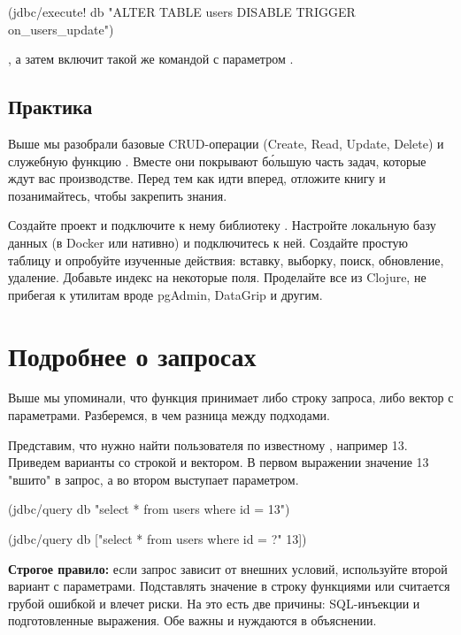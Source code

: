\begin{english}
  \begin{clojure}
(jdbc/execute! db
  "ALTER TABLE users DISABLE TRIGGER on_users_update")
  \end{clojure}
\end{english}

\noindent
, а затем включит такой же командой с параметром .

\subsection{Практика}

Выше мы разобрали базовые CRUD-операции (Create, Read, Update, Delete) и служебную функцию . Вместе они покрывают б\'{о}льшую часть задач, которые ждут вас производстве. Перед тем как идти вперед, отложите книгу и позанимайтесь, чтобы закрепить знания.

Создайте проект и подключите к нему библиотеку . Настройте локальную базу данных (в Docker или нативно) и подключитесь к ней. Создайте простую таблицу и опробуйте изученные действия: вставку, выборку, поиск, обновление, удаление. Добавьте индекс на некоторые поля. Проделайте все из Clojure, не прибегая к утилитам вроде pgAdmin, DataGrip и другим.

\section{Подробнее о запросах}

Выше мы упоминали, что функция  принимает либо строку запроса, либо вектор с параметрами. Разберемся, в чем разница между подходами.

Представим, что нужно найти пользователя по известному , например 13. Приведем варианты со строкой и вектором. В первом выражении значение 13 "вшито" в запрос, а во втором выступает параметром.

\begin{english}
  \begin{clojure}
(jdbc/query db "select * from users where id = 13")

(jdbc/query db ["select * from users where id = ?" 13])
  \end{clojure}
\end{english}

\textbf{Строгое правило:} если запрос зависит от внешних условий, используйте второй вариант с параметрами. Подставлять значение в строку функциями  или  считается грубой ошибкой и влечет риски. На это есть две причины: SQL-инъекции и подготовленные выражения. Обе важны и нуждаются в объяснении.

